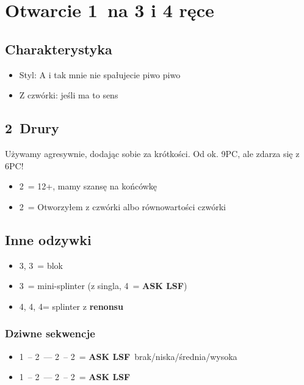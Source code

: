 \documentclass[12pt, a4paper]{article}
\newcommand{\lsf}{\color{WildStrawberry}\textbf{ASK LSF}\color{black}}
\newcommand*\link[1]{\hspace*{0em plus 1fill}\makebox{#1}}
\newcommand{\imp}{\color{BurntOrange}\link{\textbf{\large!}}\color{black}}
\begin{document}
\pagebreak
\section{Otwarcie 1\major\ na 3 i 4 ręce}
\subsection*{Charakterystyka}
\begin{itemize}
    \item Styl: A i tak mnie nie spałujecie piwo piwo
    \item Z czwórki: jeśli ma to sens
\end{itemize}

\subsection*{2\clubs\ Drury}
Używamy agresywnie, dodając sobie za krótkości. Od ok. 9PC, ale zdarza się z 6PC!
\begin{itemize}
    \item 2\diams\ = 12+, mamy szansę na końcówkę
    \item 2\major\ = Otworzyłem z czwórki albo równowartości czwórki
\end{itemize}

\subsection*{Inne odzywki} 
\begin{itemize}
    \item 3\hearts, 3\spades\ = blok
    \item 3\nt\ = mini-splinter (z singla, 4\clubs\ = \lsf)
    \item 4\clubs, 4\diams, 4\hearts = splinter z \textbf{renonsu}
\end{itemize}

\subsubsection*{Dziwne sekwencje}
\begin{itemize}
    \item 1\spades\ -- 2\clubs\ --- 2\diams\ -- 2\nt\ = \lsf\ brak/niska/średnia/wysoka \imp
    \item 1\hearts\ -- 2\clubs\ --- 2\diams\ -- 2\spades\ = \lsf
\end{itemize}



\pagebreak
\end{document}
